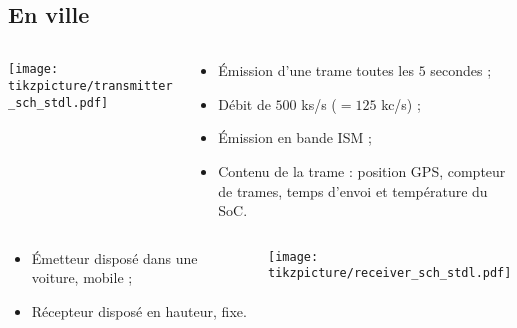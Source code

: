\documentclass[../main.tex]{subfiles}
\begin{document}
\subsection{En ville}

\begin{frame}{\subsecname}
  \begin{columns}
    \begin{column}{.5\linewidth}
      \texttt{[image: tikzpicture/transmitter\_sch\_stdl.pdf]}
    \end{column}
    \begin{column}{.5\linewidth}
      \begin{overlayarea}{\linewidth}{.55\textheight}
        \begin{itemize}
          \item Émission d'une trame toutes les $5$ secondes ;
          \item Débit de $500$ ks/s ($= 125$ kc/s) ;
          \item Émission en bande ISM ;
          \item Contenu de la trame : position GPS, compteur de trames, temps d'envoi et température du SoC.
        \end{itemize}
      \end{overlayarea}
    \end{column}
  \end{columns}

  \begin{columns}
    \begin{column}{.3\linewidth}
      \begin{itemize}
        \item Émetteur disposé dans une voiture, mobile ;
        \item Récepteur disposé en hauteur, fixe.
      \end{itemize}
    \end{column}
    \begin{column}{.7\linewidth}
      \texttt{[image: tikzpicture/receiver\_sch\_stdl.pdf]}
    \end{column}
  \end{columns}
\end{frame}
\end{document}
